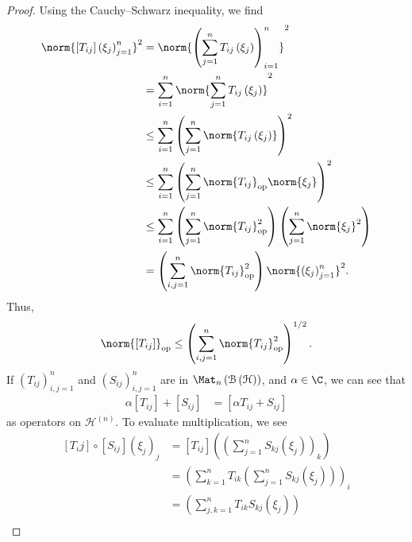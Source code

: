 \documentclass[10pt]{mypackage}
\begin{document}
\begin{proof}
  Using the Cauchy--Schwarz inequality, we find
  \begin{align*}
    \norm{\left[T_{ij}\right]\left(\xi_j\right)_{j=1}^{n}}^2 &= \norm{\left(\sum_{j=1}^{n}T_{ij}\left(\xi_j\right)\right)_{i=1}^{n}}^2\\
                                                             &= \sum_{i=1}^{n}\norm{\sum_{j=1}^{n}T_{ij}\left(\xi_j\right)}^2\\
                                                             &\leq \sum_{i=1}^{n}\left(\sum_{j=1}^{n}\norm{T_{ij}\left(\xi_j\right)}\right)^2\\
                                                             &\leq \sum_{i=1}^{n}\left(\sum_{j=1}^{n}\norm{T_{ij}}_{\text{op}}\norm{\xi_j}\right)^2\\
                                                             &\leq \sum_{i=1}^{n}\left(\sum_{j=1}^{n}\norm{T_{ij}}_{\text{op}}^2\right)\left(\sum_{j=1}^{n}\norm{\xi_{j}}^2\right)\\
                                                             &= \left(\sum_{i,j=1}^{n}\norm{T_{ij}}_{\text{op}}^2\right)\norm{\left(\xi_j\right)_{j=1}^{n}}^2.
  \end{align*}
  Thus,
  \begin{align*}
    \norm{\left[T_{ij}\right]}_{\text{op}} \leq \left(\sum_{i,j=1}^{n}\norm{T_{ij}}_{\text{op}}^2\right)^{1/2}.
  \end{align*}
  If $\left(T_{ij}\right)_{i,j=1}^{n}$ and $\left(S_{ij}\right)_{i,j=1}^{n}$ are in $\Mat_{n}\left(\mathcal{B}\left(\mathcal{H}\right)\right)$, and $\alpha \in \C$, we can see that
  \begin{align*}
    \alpha \left[T_{ij}\right] + \left[S_{ij}\right] &= \left[\alpha T_{ij} + S_{ij}\right]
  \end{align*}
  as operators on $\mathcal{H}^{(n)}$. To evaluate multiplication, we see
  \begin{align*}
    \left[T_ij\right]\circ \left[S_{ij}\right]\left(\xi_{j}\right)_{j} &= \left[T_{ij}\right]\left(\left(\sum_{j=1}^{n}S_{kj}\left(\xi_j\right)\right)_{k}\right)\\
                                                                       &= \left(\sum_{k=1}^{n}T_{ik}\left(\sum_{j=1}^{n}S_{kj}\left(\xi_j\right)\right)\right)_i\\
                                                                       &= \left(\sum_{j,k=1}^{n}T_{ik}S_{kj}\left(\xi_j\right)\right)\\

\end{align*}
\end{proof}
\end{document}

